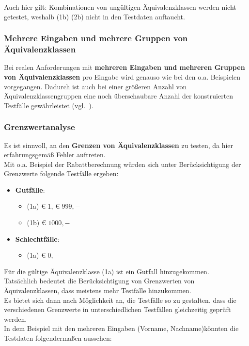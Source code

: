 \begin{tcolorbox}[colback=white]
    Auch hier gilt: Kombinationen von ungültigen Äquivalenzklassen werden nicht getestet, weshalb (1b) (2b) nicht in den Testdaten auftaucht.
\end{tcolorbox}

\subsubsection*{Mehrere Eingaben und mehrere Gruppen von Äquivalenzklassen}
Bei realen Anforderungen mit \textbf{mehreren Eingaben und mehreren Gruppen von Äquivalenzklassen} pro Eingabe wird genauso wie bei den o.a. Beispielen vorgegangen.
Dadurch ist auch bei einer größeren Anzahl von Äquivalenzklassengruppen eine noch überschaubare Anzahl der konstruierten Testfälle gewährleistet (vgl.~\cite[45]{Wed09c}).

\subsubsection*{Grenzwertanalyse}
Es ist sinnvoll, an den \textbf{Grenzen von Äquivalenzklassen} zu testen, da hier erfahrungsgemäß Fehler auftreten.\\
Mit o.a. Beispiel der Rabattberechnung würden sich unter Berücksichtigung der Grenzwerte  folgende Testfälle ergeben:

\begin{itemize}
    \item \textbf{Gutfälle}:
    \begin{itemize}
        \item (1a) € $1$, € $999,-$
        \item (1b) € $1000,-$
    \end{itemize}
    \item \textbf{Schlechtfälle}:
    \begin{itemize}
        \item (1a) € $0,-$
    \end{itemize}
\end{itemize}

\noindent
Für die gültige Äquivalenzklasse (1a) ist ein Gutfall hinzugekommen.\\
Tatsächlich bedeutet die Berücksichtigung von Grenzwerten von Äquivalenzklassen, dass meistens mehr Testfälle hinzukommen.\\
Es bietet sich dann nach Möglichkeit an, die Testfälle so zu gestalten, dass die verschiedenen Grenzwerte in unterschiedlichen Testfällen gleichzeitig geprüft werden.\\
In dem Beispiel mit den mehreren Eingaben (Vorname, Nachname)könnten die Testdaten folgendermaßen aussehen:

